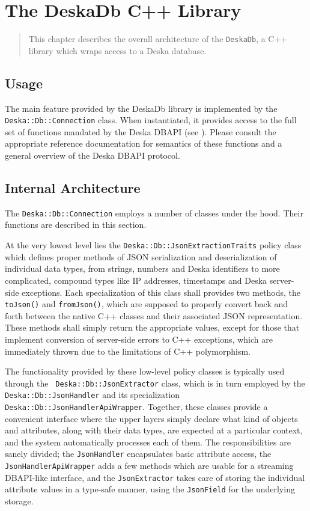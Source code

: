 \documentclass[deska]{subfiles}
\begin{document}
\chapter{The DeskaDb C++ Library}
\label{sec:cpp-deskadb}

\begin{abstract}
This chapter describes the overall architecture of the {\tt DeskaDb}, a C++ library which wraps access to a Deska
database.
\end{abstract}

\section{Usage}

The main feature provided by the DeskaDb library is implemented by the {\tt Deska::Db::Connection} class.  When
instantiated, it provides access to the full set of functions mandated by the Deska DBAPI (see ).
Please consult the appropriate reference documentation for semantics of these functions and a general overview of the
Deska DBAPI protocol.

\section{Internal Architecture}

The {\tt Deska::Db::Connection} employs a number of classes under the hood.  Their functions are described in this
section.

At the very lowest level lies the {\tt Deska::Db::JsonExtractionTraits} policy class which defines proper methods of
JSON serialization and deserialization of individual data types, from strings, numbers and Deska identifiers to more
complicated, compound types like IP addresses, timestamps and Deska server-side exceptions.  Each specialization of this
class shall provides two methods, the {\tt toJson()} and {\tt fromJson()}, which are supposed to properly convert back
and forth between the native C++ classes and their associated JSON representation.  These methods shall simply return
the appropriate values, except for those that implement conversion of server-side errors to C++ exceptions, which are
immediately thrown due to the limitations of C++ polymorphism.

The functionality provided by these low-level policy classes is typically used through the {\tt
Deska::Db::JsonExtractor} class, which is in turn employed by the {\tt Deska::Db::JsonHandler} and its specialization
{\tt Deska::Db::JsonHandlerApiWrapper}.  Together, these classes provide a convenient interface where the upper layers
simply declare what kind of objects and attributes, along with their data types, are expected at a particular context,
and the system automatically processes each of them.  The responsibilities are sanely divided; the {\tt JsonHandler}
encapsulates basic attribute access, the {\tt JsonHandlerApiWrapper} adds a few methods which are usable for a streaming
DBAPI-like interface, and the {\tt JsonExtractor} takes care of storing the individual attribute values in a type-safe
manner, using the {\tt JsonField} for the underlying storage.
\end{document}
